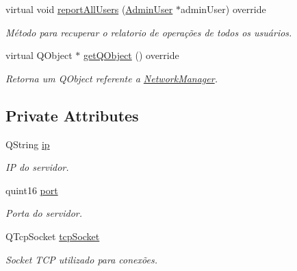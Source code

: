 \begin{DoxyCompactItemize}
virtual void \hyperlink{classNetworkManagerImpl_adc5cac6558c54ef4207cbb56fadd93bf}{report\+All\+Users} (\hyperlink{classAdminUser}{Admin\+User} $\ast$admin\+User) override
\begin{DoxyCompactList}\small\item\em Método para recuperar o relatorio de operações de todos os usuários. \end{DoxyCompactList}\item 
virtual Q\+Object $\ast$ \hyperlink{classNetworkManagerImpl_a3340057281dadf1861d94d8aba9e976e}{get\+Q\+Object} () override
\begin{DoxyCompactList}\small\item\em Retorna um Q\+Object referente a \hyperlink{classNetworkManager}{Network\+Manager}. \end{DoxyCompactList}\end{DoxyCompactItemize}
\subsection*{Private Attributes}
\begin{DoxyCompactItemize}
\item 
Q\+String \hyperlink{classNetworkManagerImpl_ac5d5c68c8000d8afef7632259e19f788}{ip}\hypertarget{classNetworkManagerImpl_ac5d5c68c8000d8afef7632259e19f788}{}\label{classNetworkManagerImpl_ac5d5c68c8000d8afef7632259e19f788}

\begin{DoxyCompactList}\small\item\em IP do servidor. \end{DoxyCompactList}\item 
quint16 \hyperlink{classNetworkManagerImpl_a4723f928e10d6d90987ff673b36c434d}{port}\hypertarget{classNetworkManagerImpl_a4723f928e10d6d90987ff673b36c434d}{}\label{classNetworkManagerImpl_a4723f928e10d6d90987ff673b36c434d}

\begin{DoxyCompactList}\small\item\em Porta do servidor. \end{DoxyCompactList}\item 
Q\+Tcp\+Socket \hyperlink{classNetworkManagerImpl_a5b0a29db0e48c67051ec36235b1df570}{tcp\+Socket}\hypertarget{classNetworkManagerImpl_a5b0a29db0e48c67051ec36235b1df570}{}\label{classNetworkManagerImpl_a5b0a29db0e48c67051ec36235b1df570}

\begin{DoxyCompactList}\small\item\em Socket T\+CP utilizado para conexões. \end{DoxyCompactList}\end{DoxyCompactItemize}
